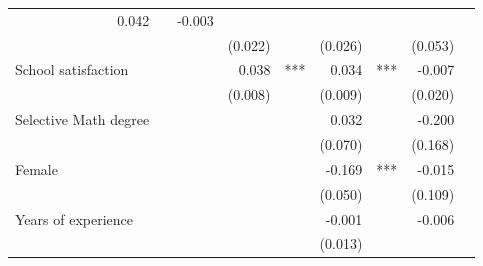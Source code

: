 \documentclass{article}
\begin{document}
\begin{table}[!h]
\begin{tabular}{lllllllll}
  \multicolumn{1}{r}{0.042} &
  \multicolumn{1}{l}{} &
  \multicolumn{1}{r}{-0.003} &
  \multicolumn{1}{l}{} \\
\multicolumn{1}{l}{} &
  \multicolumn{1}{r}{} &
  \multicolumn{1}{l}{} &
  \multicolumn{1}{r}{(0.022)} &
  \multicolumn{1}{l}{} &
  \multicolumn{1}{r}{(0.026)} &
  \multicolumn{1}{l}{} &
  \multicolumn{1}{r}{(0.053)} &
  \multicolumn{1}{l}{} \\
\multicolumn{1}{l}{School satisfaction} &
  \multicolumn{1}{r}{} &
  \multicolumn{1}{l}{} &
  \multicolumn{1}{r}{0.038} &
  \multicolumn{1}{l}{***} &
  \multicolumn{1}{r}{0.034} &
  \multicolumn{1}{l}{***} &
  \multicolumn{1}{r}{-0.007} &
  \multicolumn{1}{l}{} \\
\multicolumn{1}{l}{} &
  \multicolumn{1}{r}{} &
  \multicolumn{1}{l}{} &
  \multicolumn{1}{r}{(0.008)} &
  \multicolumn{1}{l}{} &
  \multicolumn{1}{r}{(0.009)} &
  \multicolumn{1}{l}{} &
  \multicolumn{1}{r}{(0.020)} &
  \multicolumn{1}{l}{} \\
\multicolumn{1}{l}{Selective Math degree} &
  \multicolumn{1}{r}{} &
  \multicolumn{1}{l}{} &
  \multicolumn{1}{r}{} &
  \multicolumn{1}{l}{} &
  \multicolumn{1}{r}{0.032} &
  \multicolumn{1}{l}{} &
  \multicolumn{1}{r}{-0.200} &
  \multicolumn{1}{l}{} \\
\multicolumn{1}{l}{} &
  \multicolumn{1}{r}{} &
  \multicolumn{1}{l}{} &
  \multicolumn{1}{r}{} &
  \multicolumn{1}{l}{} &
  \multicolumn{1}{r}{(0.070)} &
  \multicolumn{1}{l}{} &
  \multicolumn{1}{r}{(0.168)} &
  \multicolumn{1}{l}{} \\
\multicolumn{1}{l}{Female} &
  \multicolumn{1}{r}{} &
  \multicolumn{1}{l}{} &
  \multicolumn{1}{r}{} &
  \multicolumn{1}{l}{} &
  \multicolumn{1}{r}{-0.169} &
  \multicolumn{1}{l}{***} &
  \multicolumn{1}{r}{-0.015} &
  \multicolumn{1}{l}{} \\
\multicolumn{1}{l}{} &
  \multicolumn{1}{r}{} &
  \multicolumn{1}{l}{} &
  \multicolumn{1}{r}{} &
  \multicolumn{1}{l}{} &
  \multicolumn{1}{r}{(0.050)} &
  \multicolumn{1}{l}{} &
  \multicolumn{1}{r}{(0.109)} &
  \multicolumn{1}{l}{} \\
\multicolumn{1}{l}{Years of experience} &
  \multicolumn{1}{r}{} &
  \multicolumn{1}{l}{} &
  \multicolumn{1}{r}{} &
  \multicolumn{1}{l}{} &
  \multicolumn{1}{r}{-0.001} &
  \multicolumn{1}{l}{} &
  \multicolumn{1}{r}{-0.006} &
  \multicolumn{1}{l}{} \\
\multicolumn{1}{l}{} &
  \multicolumn{1}{r}{} &
  \multicolumn{1}{l}{} &
  \multicolumn{1}{r}{} &
  \multicolumn{1}{l}{} &
  \multicolumn{1}{r}{(0.013)} &

\end{tabular}
\end{table}
\end{document}
